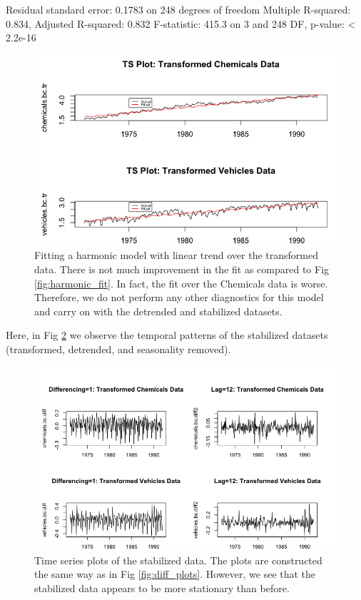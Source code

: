 \begin{enumerate}[label=(\roman*)]
\begin{block}
Residual standard error: 0.1783 on 248 degrees of freedom
Multiple R-squared:  0.834,	Adjusted R-squared:  0.832 
F-statistic: 415.3 on 3 and 248 DF,  p-value: < 2.2e-16
\end{block}
\normalsize
\begin{figure}[!htb]
    \centering
    \includegraphics[width=\linewidth]{Images/P3/Lfit_BoxCox.png}
    \caption[Fitting a harmonic model with linear trend over the transformed data.]{Fitting a harmonic model with linear trend over the transformed data. There is not much improvement in the fit as compared to Fig \ref{fig:harmonic_fit}. In fact, the fit over the Chemicals data is worse. Therefore, we do not perform any other diagnostics for this model and carry on with the detrended and stabilized datasets.}
    \label{fig:harmonic_bc_fit}
\end{figure}

Here, in Fig \ref{fig:diff_bc_plots} we observe the temporal patterns of the stabilized datasets (transformed, detrended, and seasonality removed).
\begin{figure}[!htb]
    \centering
    \includegraphics[width=\linewidth]{Images/P3/Diff_BC_Plots.png}
    \caption[Time series plots of the stabilized data.]{Time series plots of the stabilized data. The plots are constructed the same way as in Fig \ref{fig:diff_plots}. However, we see that the stabilized data appears to be more stationary than before.}
    \label{fig:diff_bc_plots}
\end{figure}


\end{enumerate}
